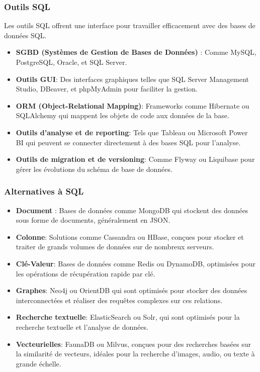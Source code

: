 \begin{frame}
  \frametitle{Outils SQL}

  Les outils SQL offrent une interface pour travailler efficacement avec des bases de données SQL.

  \begin{itemize}
      \item \textbf{SGBD (Systèmes de Gestion de Bases de Données)} : Comme MySQL, PostgreSQL, Oracle, et SQL Server.
      \item \textbf{Outils GUI}: Des interfaces graphiques telles que SQL Server Management Studio, DBeaver, et phpMyAdmin pour faciliter la gestion.
      \item \textbf{ORM (Object-Relational Mapping)}: Frameworks comme Hibernate ou SQLAlchemy qui mappent les objets de code aux données de la base.
      \item \textbf{Outils d'analyse et de reporting}: Tels que Tableau ou Microsoft Power BI qui peuvent se connecter directement à des bases SQL pour l'analyse.
      \item \textbf{Outils de migration et de versioning}: Comme Flyway ou Liquibase pour gérer les évolutions du schéma de base de données.
  \end{itemize}
\end{frame}

\begin{frame}
  \frametitle{Alternatives à SQL}

  \begin{itemize}
      \item \textbf{Document} : Bases de données comme MongoDB qui stockent des données sous forme de documents, généralement en JSON.
      \item \textbf{Colonne}: Solutions comme Cassandra ou HBase, conçues pour stocker et traiter de grands volumes de données sur de nombreux serveurs.
      \item \textbf{Clé-Valeur}: Bases de données comme Redis ou DynamoDB, optimisées pour les opérations de récupération rapide par clé.
      \item \textbf{Graphes}: Neo4j ou OrientDB qui sont optimisés pour stocker des données interconnectées et réaliser des requêtes complexes sur ces relations.
      \item \textbf{Recherche textuelle}: ElasticSearch ou Solr, qui sont optimisés pour la recherche textuelle et l'analyse de données.
      \item \textbf{Vecteurielles}: FaunaDB ou Milvus, conçues pour des recherches basées sur la similarité de vecteurs, idéales pour la recherche d'images, audio, ou texte à grande échelle.
  \end{itemize}
\end{frame}

